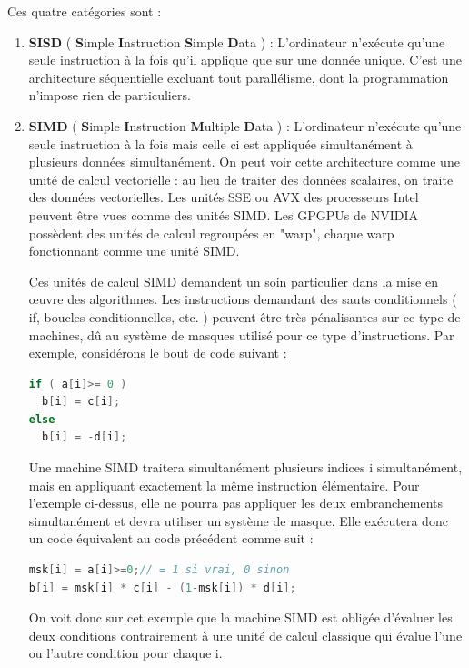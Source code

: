 \documentclass[fleqn,11pt]{article}
\begin{document}
Ces quatre catégories sont : 
\begin{enumerate}
\item \textbf{SISD} ( {\bf S}imple {\bf I}nstruction {\bf S}imple {\bf D}ata ) : L'ordinateur n'exécute qu'une seule instruction à la fois qu'il applique que sur une donnée unique. C'est une architecture séquentielle excluant tout parallélisme, dont la programmation n'impose rien de particuliers.

\item \textbf{SIMD} ( {\bf S}imple {\bf I}nstruction {\bf M}ultiple {\bf D}ata ) : L'ordinateur n'exécute qu'une seule instruction à la fois mais celle ci est appliquée simultanément à plusieurs données simultanément. On peut voir cette architecture comme une unité de calcul vectorielle : au lieu de traiter des données scalaires, on traite des données vectorielles. Les unités SSE ou AVX des processeurs Intel peuvent être vues comme des unités SIMD. Les GPGPUs de NVIDIA possèdent des unités de calcul regroupées en "warp",  chaque warp fonctionnant comme une unité SIMD. 

Ces unités de calcul SIMD demandent un soin particulier dans la mise en œuvre des algorithmes. Les instructions demandant des sauts conditionnels ( if, boucles conditionnelles, etc. ) peuvent être très pénalisantes sur ce type de machines, dû au système de masques utilisé pour ce type d'instructions. Par exemple, considérons le bout de code suivant :

\begin{lstlisting}[language=C++]
if ( a[i]>= 0 )
  b[i] = c[i];
else
  b[i] = -d[i];
\end{lstlisting}

Une machine SIMD traitera simultanément plusieurs indices i simultanément, mais en appliquant exactement  la même instruction élémentaire.  Pour l'exemple ci-dessus, elle ne pourra pas appliquer les deux embranchements simultanément et devra utiliser un système de masque. Elle exécutera donc un code équivalent au code précédent  comme suit :

\begin{lstlisting}[language=C++]
msk[i] = a[i]>=0;// = 1 si vrai, 0 sinon
b[i] = msk[i] * c[i] - (1-msk[i]) * d[i];
\end{lstlisting}

On voit donc sur cet exemple que la machine SIMD est obligée  d'évaluer les deux conditions contrairement à une unité de calcul classique qui évalue l'une ou l'autre condition pour chaque i.


\end{enumerate}
\end{document}
